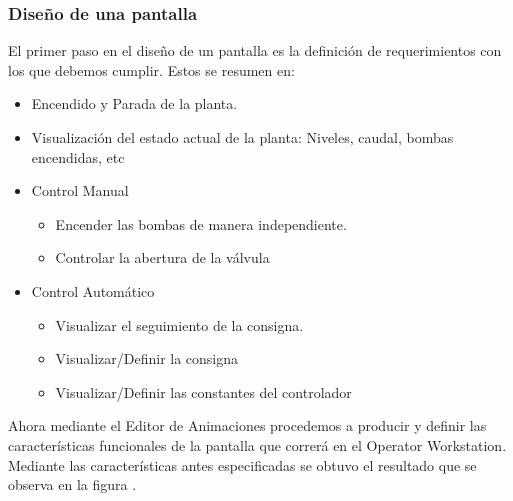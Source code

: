 \subsubsection{Diseño de una pantalla}
El primer paso en el diseño de un pantalla es la definición de requerimientos con los que debemos cumplir. 
Estos se resumen en:
\begin{itemize}
 \item Encendido y Parada de la planta.
 \item Visualización del estado actual de la planta: Niveles, caudal, bombas encendidas, etc

 \item Control Manual
 \begin{itemize}
  \item Encender las bombas de manera independiente.
  \item Controlar la abertura de la válvula
 \end{itemize}

 \item Control Automático
 \begin{itemize}
  \item Visualizar el seguimiento de la consigna.
  \item Visualizar/Definir la consigna
  \item Visualizar/Definir las constantes del controlador
 \end{itemize}
\end{itemize}

Ahora mediante el Editor de Animaciones procedemos a producir y definir las características 
funcionales de la pantalla  que correrá en el Operator Workstation. Mediante las 
características antes especificadas se obtuvo el resultado que se observa 
en la figura . 

